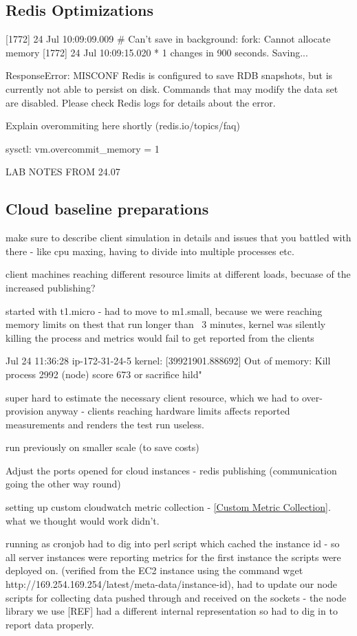 \documentclass{uvamscse}
\begin{document}
\subsection{Redis Optimizations}
[1772] 24 Jul 10:09:09.009 \# Can't save in background: fork: Cannot allocate memory
[1772] 24 Jul 10:09:15.020 * 1 changes in 900 seconds. Saving...

ResponseError: MISCONF Redis is configured to save RDB snapshots, but is currently not able to persist on disk. Commands that may modify the data set are disabled. Please check Redis logs for details about the error.

Explain overommiting here shortly (redis.io/topics/faq)

sysctl: vm.overcommit\_memory = 1

LAB NOTES FROM 24.07

\subsection{Cloud baseline preparations}

make sure to describe client simulation in details and issues that you battled with there - like cpu maxing, having to divide into multiple processes etc.

client machines reaching different resource limits at different loads, becuase of the increased publishing?

started with t1.micro - had to move to m1.small, because we were reaching memory limits on thest that run longer than ~3 minutes, kernel was silently killing the process and metrics would fail to get reported from the clients

Jul 24 11:36:28 ip-172-31-24-5 kernel: [39921901.888692] Out of memory: Kill process 2992 (node) score 673 or sacrifice hild"

super hard to estimate the necessary client resource, which we had to over-provision anyway - clients reaching hardware limits affects reported measurements and renders the test run useless.

run previously on smaller scale (to save costs)

Adjust the ports opened for cloud instances - redis publishing (communication going the other way round)

setting up custom cloudwatch metric collection - \ref{Custom Metric Collection}. what we thought would work didn't.

running as cronjob
had to dig into perl script which cached the instance id - so all server instances were reporting metrics for the first instance the scripts were deployed on. (verified from the EC2 instance using the command wget http://169.254.169.254/latest/meta-data/instance-id),
had to update our node scripts for collecting data pushed through and received on the sockets - the node library we use [REF] had a different internal representation so had to dig in to report data properly.
\end{document}
